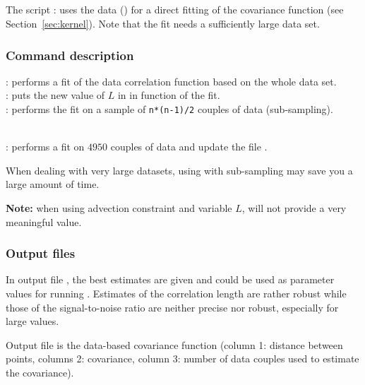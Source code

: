 \subsection{ \label{sec:divafit}}

The script : uses the data () for a direct fitting of the covariance function (see Section~\ref{sec:kernel}). Note that the fit needs a sufficiently large data set.

\subsubsection{Command description}

 \qquad: performs a fit of the data correlation function based on the whole data set. \\
 \qquad: puts the new value of $L$ in  in function of the fit.\\
 \qquad: performs the fit on a sample of \texttt{n*(n-1)/2} couples of data (sub-sampling). 

\example\\
: performs a fit on $4950$ couples of data and update the file .

\btips
When dealing with very large datasets, using  with sub-sampling may save you a large amount of time.
\etips

\textbf{Note:} when using advection constraint and variable $L$,  will not provide a very meaningful value.

\subsubsection{Output files}

In output file , the best estimates are given and could be used as parameter values for running \diva.
Estimates of the correlation length are rather robust while those of the signal-to-noise ratio are neither precise nor robust, especially for large values.

Output file  is the data-based covariance function (column 1: distance between points, columns 2: covariance, column 3: number of data couples used to estimate the covariance). 

